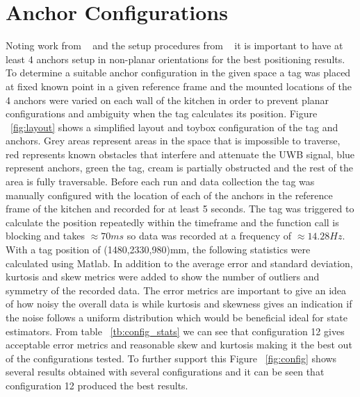 \section{Anchor Configurations}\label{sec:anchor-configurations}
Noting work from ~\citet{di2019evaluation} and the setup procedures from ~\citet{pozyx2018pozyx} it is important to have at least 4 anchors setup in non-planar orientations for the best positioning results.
To determine a suitable anchor configuration in the given space a tag was placed at fixed known point in a given reference frame and the mounted locations of the 4 anchors were varied on each wall of the kitchen in order to prevent planar configurations and ambiguity when the tag calculates its position.
Figure ~\ref{fig:layout} shows a simplified layout and toybox configuration of the tag and anchors.
Grey areas represent areas in the space that is impossible to traverse, red represents known obstacles that interfere and attenuate the UWB signal, blue represent anchors, green the tag, cream is partially obstructed and the rest of the area is fully traversable.
Before each run and data collection the tag was manually configured with the location of each of the anchors in the reference frame of the kitchen and recorded for at least 5 seconds.
The tag was triggered to calculate the position repeatedly within the timeframe and the function call is blocking and takes $\approx70ms$ so data was recorded at a frequency of $\approx14.28Hz$.
With a tag position of (1480,2330,980)mm, the following statistics were calculated using Matlab.
In addition to the average error and standard deviation,  kurtosis and skew metrics were added to show the number of outliers and symmetry of the recorded data.
The error metrics are important to give an idea of how noisy the overall data is while kurtosis and skewness gives an indication if the noise follows a uniform distribution which would be beneficial ideal for state estimators.
From table ~\ref{tb:config_stats} we can see that configuration 12 gives acceptable error metrics and reasonable skew and kurtosis making it the best out of the configurations tested.
To further support this Figure ~\ref{fig:config} shows several results obtained with several configurations and it can be seen that configuration 12 produced the best results.

